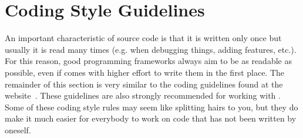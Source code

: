 \chapter{Coding Style Guidelines}
\label{guidelines}

An important characteristic of source code is that it is written only
once but usually it is read many times (e.g. when debugging things,
adding features, etc.). For this reason, good programming frameworks
always aim to be as readable as possible, even if comes with higher
effort to write them in the first place. The remainder of this section
is very similar to the \Dune coding guidelines found at the \Dune
website~\cite{DUNE-HP}. These guidelines are also strongly recommended
for working with \eWoms. Some of these coding style rules may seem
like splitting hairs to you, but they do make it much easier for
everybody to work on code that has not been written by oneself.

